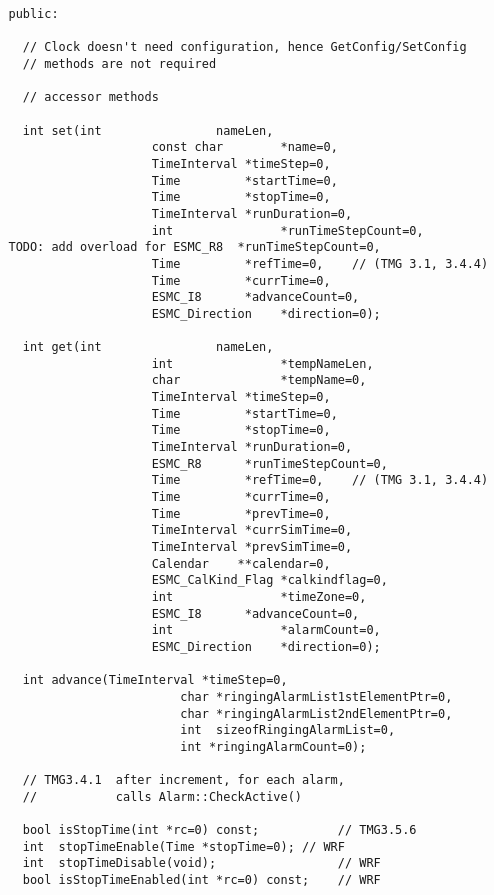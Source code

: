 \begin{verbatim} 
   public:
 
     // Clock doesn't need configuration, hence GetConfig/SetConfig
     // methods are not required
 
     // accessor methods
 
     int set(int                nameLen,
                       const char        *name=0,
                       TimeInterval *timeStep=0,
                       Time         *startTime=0,
                       Time         *stopTime=0,
                       TimeInterval *runDuration=0,
                       int               *runTimeStepCount=0,
   TODO: add overload for ESMC_R8  *runTimeStepCount=0,
                       Time         *refTime=0,    // (TMG 3.1, 3.4.4)
                       Time         *currTime=0,
                       ESMC_I8      *advanceCount=0,
                       ESMC_Direction    *direction=0);
 
     int get(int                nameLen,
                       int               *tempNameLen,
                       char              *tempName=0,
                       TimeInterval *timeStep=0,
                       Time         *startTime=0,
                       Time         *stopTime=0,
                       TimeInterval *runDuration=0,
                       ESMC_R8      *runTimeStepCount=0,
                       Time         *refTime=0,    // (TMG 3.1, 3.4.4)
                       Time         *currTime=0, 
                       Time         *prevTime=0, 
                       TimeInterval *currSimTime=0, 
                       TimeInterval *prevSimTime=0, 
                       Calendar    **calendar=0,
                       ESMC_CalKind_Flag *calkindflag=0,
                       int               *timeZone=0,
                       ESMC_I8      *advanceCount=0, 
                       int               *alarmCount=0,
                       ESMC_Direction    *direction=0);
 
     int advance(TimeInterval *timeStep=0,
                           char *ringingAlarmList1stElementPtr=0, 
                           char *ringingAlarmList2ndElementPtr=0, 
                           int  sizeofRingingAlarmList=0, 
                           int *ringingAlarmCount=0);
 
     // TMG3.4.1  after increment, for each alarm,
     //           calls Alarm::CheckActive()
 
     bool isStopTime(int *rc=0) const;           // TMG3.5.6
     int  stopTimeEnable(Time *stopTime=0); // WRF
     int  stopTimeDisable(void);                 // WRF
     bool isStopTimeEnabled(int *rc=0) const;    // WRF
 

\end{verbatim}
